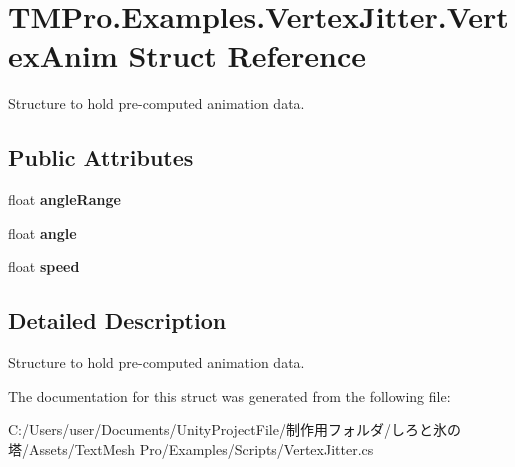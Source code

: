 \hypertarget{struct_t_m_pro_1_1_examples_1_1_vertex_jitter_1_1_vertex_anim}{}\section{T\+M\+Pro.\+Examples.\+Vertex\+Jitter.\+Vertex\+Anim Struct Reference}
\label{struct_t_m_pro_1_1_examples_1_1_vertex_jitter_1_1_vertex_anim}


Structure to hold pre-\/computed animation data.  


\subsection*{Public Attributes}
\begin{DoxyCompactItemize}
\item 
\mbox{\label{struct_t_m_pro_1_1_examples_1_1_vertex_jitter_1_1_vertex_anim_ad829f085baf9a3502c027a0ff26ea507}} 
float {\bfseries angle\+Range}
\item 
\mbox{\label{struct_t_m_pro_1_1_examples_1_1_vertex_jitter_1_1_vertex_anim_ae878879bcf64dac0b4200a981b11b2d2}} 
float {\bfseries angle}
\item 
\mbox{\label{struct_t_m_pro_1_1_examples_1_1_vertex_jitter_1_1_vertex_anim_a3c8420566e44d2778a651b41e4977479}} 
float {\bfseries speed}
\end{DoxyCompactItemize}


\subsection{Detailed Description}
Structure to hold pre-\/computed animation data. 



The documentation for this struct was generated from the following file\+:\begin{DoxyCompactItemize}
\item 
C\+:/\+Users/user/\+Documents/\+Unity\+Project\+File/制作用フォルダ/しろと氷の塔/\+Assets/\+Text\+Mesh Pro/\+Examples/\+Scripts/Vertex\+Jitter.\+cs\end{DoxyCompactItemize}
